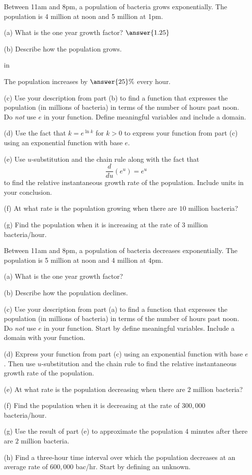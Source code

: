 \documentclass{ximera}
\newcommand{\pskip}{\vskip 0.1 in}
\begin{document}
\begin{question}  \label{Qe545tgbvb}
Between 11am and 8pm, a population of bacteria grows exponentially. The population is 4 million at noon and 5 million at 1pm.

(a) What is the one year growth factor?  $\answer{1.25}$

(b) Describe how the population grows. 

\pskip

The population increases by $\answer{25}\%$ every hour.

(c) Use your description from part (b) to find a function that expresses the population (in millions of bacteria) in terms of the number of hours past noon. Do \emph{not} use $e$ in your function. Define meaningful variables and include a domain.

(d) Use the fact that $k = e^{\ln k}$ for $k>0$ to express your function from part (c) using an exponential function with base $e$.

(e) Use $u$-substitution and the chain rule along with the fact that 
\[
     \frac{d}{du}(e^{u}) = e^{u}
\]
to find the relative instantaneous growth rate of the population. Include units in your conclusion.

(f) At what rate is the population growing when there are $10$ million bacteria?

(g) Find the population when it is increasing at the rate of $3$ million bacteria/hour.

\end{question}


\begin{question}  \label{Q234gt44}
Between 11am and 8pm, a population of bacteria decreases exponentially. The population is 5 million at noon and 4 million at 4pm.

(a) What is the one year growth factor?

(b) Describe how the population declines.

(c) Use your description from part (a) to find a function that expresses the population (in millions of bacteria) in terms of the number of hours past noon. Do \emph{not} use $e$ in your function. Start by define meaningful variables. Include a domain with your function.

(d) Express your function from part (c) using an exponential function with base $e$. Then use $u$-substitution and the chain rule to find the relative instantaneous growth rate of the population.

(e) At what rate is the population decreasing when there are $2$ million bacteria?

(f) Find the population when it is decreasing at the rate of $300,000$ bacteria/hour.

(g) Use the result of part (e) to approximate the population 4 minutes after there are $2$ million bacteria.

(h) Find a three-hour time interval over which the population decreases at an average rate of $600,000$ bac/hr. Start by defining an unknown.

\end{question}
\end{document}
